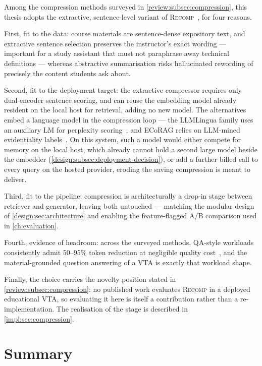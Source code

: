 Among the compression methods surveyed in \autoref{review:subsec:compression},
this thesis adopts the extractive, sentence-level variant of
\textsc{Recomp}~\cite{iclr24:Xu}, for four reasons.

First, fit to the data: course materials are sentence-dense expository text,
and extractive sentence selection preserves the instructor's exact wording
--- important for a study assistant that must not paraphrase away technical
definitions --- whereas abstractive summarisation risks hallucinated
rewording of precisely the content students ask about.

Second, fit to the deployment target: the extractive compressor requires only
dual-encoder sentence scoring, and can reuse the embedding model already
resident on the local host for retrieval, adding no new model. The
alternatives embed a language model in the compression loop --- the
LLMLingua family uses an auxiliary LM for perplexity
scoring~\cite{emnlp23:Jiang, acl24:Jiang}, and ECoRAG relies on LLM-mined
evidentiality labels~\cite{facl25:Jeong}. On this system, such a model would
either compete for memory on the local host, which already cannot hold a
second large model beside the embedder
(\autoref{design:subsec:deployment-decision}), or add a further billed call
to every query on the hosted provider, eroding the saving compression is
meant to deliver.

Third, fit to the pipeline: compression is architecturally a drop-in stage
between retriever and generator, leaving both untouched --- matching the
modular design of \autoref{design:sec:architecture} and enabling the
feature-flagged A/B comparison used in \autoref{ch:evaluation}.

Fourth, evidence of headroom: across the surveyed methods, QA-style workloads
consistently admit 50--95\% token reduction at negligible quality
cost~\cite{femnlp23:Liu, iclr24:Xu, emnlp23:Jiang, acl24:Jiang, emnlp23:Li},
and the material-grounded question answering of a VTA is exactly that
workload shape.

Finally, the choice carries the novelty position stated in
\autoref{review:subsec:compression}: no published work evaluates
\textsc{Recomp} in a deployed educational VTA, so evaluating it here is
itself a contribution rather than a re-implementation. The realisation of
the stage is described in \autoref{impl:sec:compression}.

\section{Summary}
\label{design:sec:summary}

